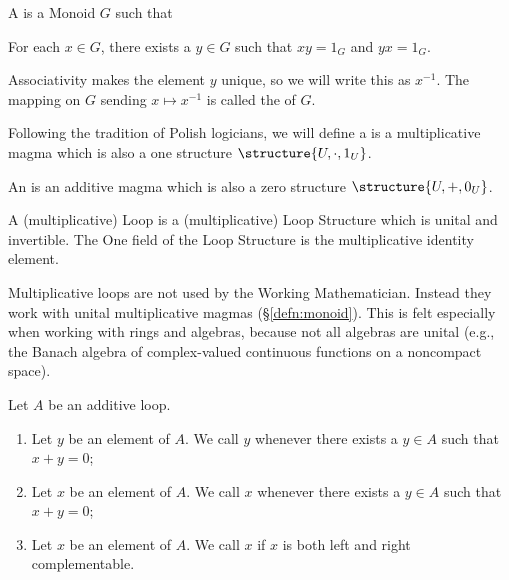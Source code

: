 \begin{definition}
A  is a Monoid $G$ such that
\begin{itemize}
 For each $x\in G$, there
  exists a $y\in G$ such that $xy=1_{G}$ and $yx=1_{G}$.
\end{itemize}
Associativity makes the element $y$ unique, so we will write this as
$x^{-1}$. The mapping on $G$ sending $x\mapsto x^{-1}$ is called the
 of $G$.
\end{definition}

\begin{definition}
Following the tradition of Polish logicians, we will define a
 is a multiplicative magma which
is also a one structure $\structure{U,\cdot,1_{U}}$.

An  is an additive magma which is also a zero
structure $\structure{U,+,0_{U}}$.

A (multiplicative) Loop is a (multiplicative) Loop Structure which is
unital and invertible. The One field of the Loop Structure is the
multiplicative identity element.
\end{definition}

\begin{remark}
Multiplicative loops are not used by the Working Mathematician.
Instead they work with unital multiplicative magmas (\S\ref{defn:monoid}).
This is felt especially when working with rings and algebras, because
not all algebras are unital (e.g., the Banach algebra of complex-valued
continuous functions on a noncompact space).
\end{remark}

\begin{definition}
Let $A$ be an additive loop.
\begin{enumerate}
\item{} Let $y$ be an element of $A$. We call $y$
   whenever there exists a $y\in A$ such
  that $x+y=0$;
\item{} Let $x$ be an element of $A$. We call $x$
   whenever there exists a $y\in A$ such
  that $x+y=0$;
\item{} Let $x$ be an element of $A$. We call $x$
   if $x$ is both left and right complementable.
\end{enumerate}
\end{definition}

